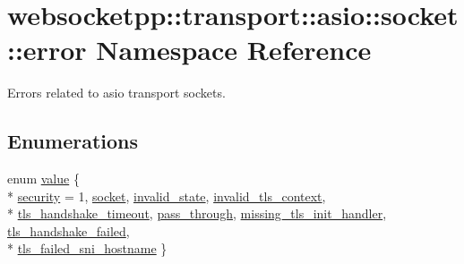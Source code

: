 \hypertarget{namespacewebsocketpp_1_1transport_1_1asio_1_1socket_1_1error}{}\section{websocketpp\+:\+:transport\+:\+:asio\+:\+:socket\+:\+:error Namespace Reference}
\label{namespacewebsocketpp_1_1transport_1_1asio_1_1socket_1_1error}


Errors related to asio transport sockets.  


\subsection*{Enumerations}
\begin{DoxyCompactItemize}
\item 
enum \hyperlink{namespacewebsocketpp_1_1transport_1_1asio_1_1socket_1_1error_a828ddaa5ed63a761e1b557465a35f05a}{value} \{ \\*
\hyperlink{namespacewebsocketpp_1_1transport_1_1asio_1_1socket_1_1error_a828ddaa5ed63a761e1b557465a35f05aacaab9f83cf829c57e4d1c76eafff7540}{security} = 1, 
\hyperlink{namespacewebsocketpp_1_1transport_1_1asio_1_1socket_1_1error_a828ddaa5ed63a761e1b557465a35f05aa0c31b356014843e1d09514e794a539a7}{socket}, 
\hyperlink{namespacewebsocketpp_1_1transport_1_1asio_1_1socket_1_1error_a828ddaa5ed63a761e1b557465a35f05aa380b076a3c91fb5336539d7f4d395777}{invalid\+\_\+state}, 
\hyperlink{namespacewebsocketpp_1_1transport_1_1asio_1_1socket_1_1error_a828ddaa5ed63a761e1b557465a35f05aa2ad7fa2055918823bdedb031839de9de}{invalid\+\_\+tls\+\_\+context}, 
\\*
\hyperlink{namespacewebsocketpp_1_1transport_1_1asio_1_1socket_1_1error_a828ddaa5ed63a761e1b557465a35f05aa6ae4c96e0d2a177bb3c8eab1c45ccda0}{tls\+\_\+handshake\+\_\+timeout}, 
\hyperlink{namespacewebsocketpp_1_1transport_1_1asio_1_1socket_1_1error_a828ddaa5ed63a761e1b557465a35f05aaa4b14e51bb97d6ab9654ee7219ffca30}{pass\+\_\+through}, 
\hyperlink{namespacewebsocketpp_1_1transport_1_1asio_1_1socket_1_1error_a828ddaa5ed63a761e1b557465a35f05aa295e5ba0b108125ce445aa2ce1ec45cd}{missing\+\_\+tls\+\_\+init\+\_\+handler}, 
\hyperlink{namespacewebsocketpp_1_1transport_1_1asio_1_1socket_1_1error_a828ddaa5ed63a761e1b557465a35f05aa61f1919da9afed818c8533b0dcf9d2db}{tls\+\_\+handshake\+\_\+failed}, 
\\*
\hyperlink{namespacewebsocketpp_1_1transport_1_1asio_1_1socket_1_1error_a828ddaa5ed63a761e1b557465a35f05aa5eb29de1a4e86186b431ead37d402970}{tls\+\_\+failed\+\_\+sni\+\_\+hostname}
 \}
\end{DoxyCompactItemize}


